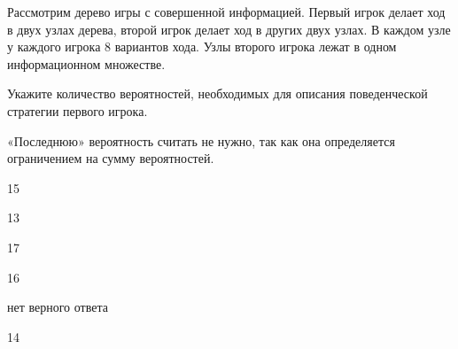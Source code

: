
\begin{question}
Рассмотрим дерево игры с совершенной информацией. Первый игрок делает
ход в двух узлах дерева, второй игрок делает ход в других двух узлах. В
каждом узле у каждого игрока 8 вариантов хода. Узлы второго игрока лежат
в одном информационном множестве.

Укажите количество вероятностей, необходимых для описания поведенческой
стратегии первого игрока.

«Последнюю» вероятность считать не нужно, так как она определяется
ограничением на сумму вероятностей.
\begin{answerlist}
  \item 15
  \item 13
  \item 17
  \item 16
  \item нет верного ответа
  \item 14
\end{answerlist}
\end{question}


